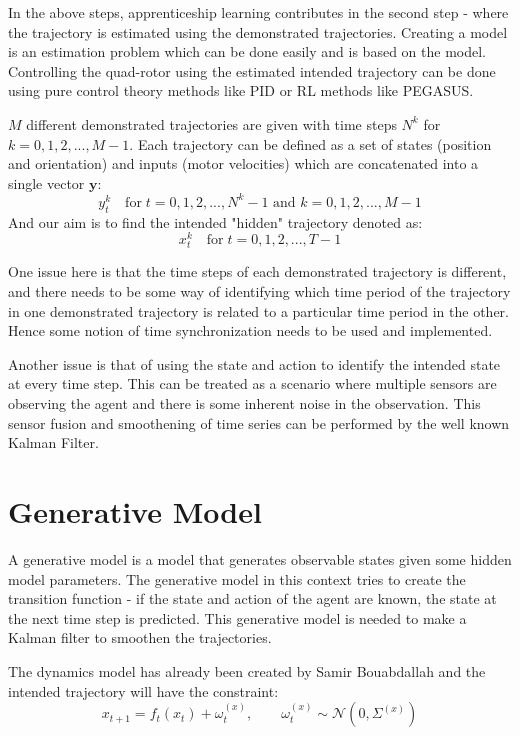 \documentclass[hidelinks,BTech]{iitmdiss}
\begin{document}
In the above steps, apprenticeship learning contributes in the second step - where the trajectory is estimated using the demonstrated trajectories. Creating a model is an estimation problem \cite{EstTheo} which can be done easily and is based on the model. Controlling the quad-rotor using the estimated intended trajectory can be done using pure control theory methods like PID or RL methods like PEGASUS.

$M$ different demonstrated trajectories are given with time steps $N^k$ for $k = 0, 1, 2, ..., M-1$. Each trajectory can be defined as a set of states (position and orientation) and inputs (motor velocities) which are concatenated into a single vector $\mathbf{y}$:
\begin{equation}
  y_{t}^{k} \quad \text{for} \; t = 0, 1, 2, ..., N^{k}-1 \text{ and } k = 0, 1, 2, ..., M-1
\end{equation}
And our aim is to find the intended "hidden" trajectory denoted as:
\begin{equation}
  x_{t}^{k} \quad \text{for} \; t = 0, 1, 2, ..., T-1
\end{equation}

One issue here is that the time steps of each demonstrated trajectory is different, and there needs to be some way of identifying which time period of the trajectory in one demonstrated trajectory is related to a particular time period in the other. Hence some notion of time synchronization needs to be used and implemented.

Another issue is that of using the state and action to identify the intended state at every time step. This can be treated as a scenario where multiple sensors are observing the agent and there is some inherent noise in the observation. This sensor fusion and smoothening of time series can be performed by the well known Kalman Filter.

\section{Generative Model}

A generative model is a model that generates observable states given some hidden model parameters. The generative model in this context tries to create the transition function - if the state and action of the agent are known, the state at the next time step is predicted. This generative model is needed to make a Kalman filter to smoothen the trajectories.

The dynamics model has already been created by Samir Bouabdallah \cite{QuadrotorDynamics} and the intended trajectory will have the constraint:
\begin{equation}
  x_{t+1} = f_{t} (x_{t}) + {\omega}_{t}^{(x)}, \qquad \omega_t^{(x)} \sim \mathcal{N} (0, \Sigma^{(x)})
\end{equation}
\end{document}
